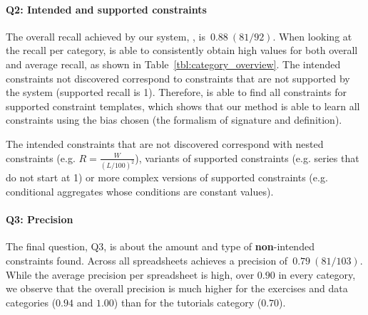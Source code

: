 \paragraph{Q2: Intended and supported constraints}
The overall recall achieved by our system, \sname, is~$0.88~(81/92)$.
When looking at the recall per category, \sname is able to consistently obtain high values for both overall and average recall, as shown in Table~\ref{tbl:category_overview}.
The intended constraints not discovered correspond to constraints that are not supported by the system (supported recall is 1).
Therefore, \sname is able to find all constraints for supported constraint templates, which shows that our method is able to learn all constraints using the bias chosen (the formalism of signature and definition). %


The intended constraints that are not discovered correspond with nested constraints (e.g. $R = \frac{W}{(L/100)^2}$), variants of supported constraints (e.g. series that do not start at 1) or more complex versions of supported constraints (e.g. conditional aggregates whose conditions are constant values). %

\paragraph{Q3: Precision}
The final question, Q3, is about the amount and type of \textbf{non}-intended constraints found.
Across all spreadsheets \sname achieves a precision of~$0.79~(81/103)$.
While the average precision per spreadsheet is high, over $0.90$ in every category, we observe that the overall precision is much higher for the exercises and data categories ($0.94$ and $1.00$) than for the tutorials category ($0.70$).

